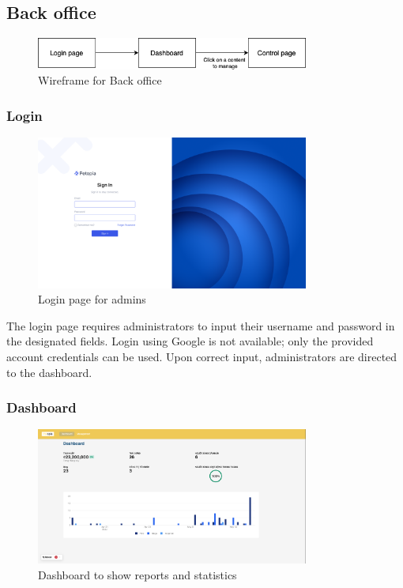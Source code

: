 \subsection{Back office}

\begin{figure}[H]
    \centering
    \includegraphics[width=0.8\textwidth]{Figures/wireframe_bo.png}
    \caption{Wireframe for Back office}
\end{figure}

\subsubsection{Login}

\begin{figure}[H]
    \centering
    \includegraphics[width=0.8\textwidth]{Figures/UI/login_bo_ui.png}
    \caption{Login page for admins}
\end{figure}

The login page requires administrators to input their username and password in the designated fields.
Login using Google is not available; only the provided account credentials can be used. 
Upon correct input, administrators are directed to the dashboard.

\subsubsection{Dashboard}

\begin{figure}[H]
    \centering
    \includegraphics[width=0.8\textwidth]{Figures/UI/dashboard_bo_ui.png}
    \caption{Dashboard to show reports and statistics}
\end{figure}

